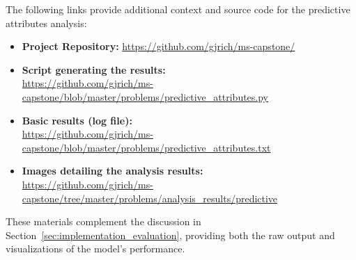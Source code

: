 \documentclass[runningheads]{llncs}
\begin{document}
The following links provide additional context and source code for the predictive attributes analysis:

\begin{itemize}
    \item \textbf{Project Repository:} \url{https://github.com/gjrich/ms-capstone/}
    
    \item \textbf{Script generating the results:} \\\url{https://github.com/gjrich/ms-capstone/blob/master/problems/predictive_attributes.py}

    \item \textbf{Basic results (log file):} \\\url{https://github.com/gjrich/ms-capstone/blob/master/problems/predictive_attributes.txt}

    \item \textbf{Images detailing the analysis results:} \\\url{https://github.com/gjrich/ms-capstone/tree/master/problems/analysis_results/predictive}
\end{itemize}

These materials complement the discussion in Section~\ref{sec:implementation_evaluation}, providing both the raw output and visualizations of the model's performance.



\end{document}
